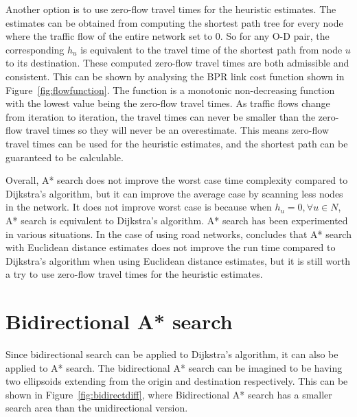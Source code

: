 Another option is to use zero-flow travel times for the heuristic estimates.
The estimates can be obtained from computing the shortest path tree for every node where the traffic flow of the entire network set to 0.
So for any O-D pair, the corresponding $h_u$ is equivalent to the travel time of the shortest path from node $u$ to its destination.
These computed zero-flow travel times are both admissible and consistent.
This can be shown by analysing the BPR link cost function shown in Figure~\ref{fig:flowfunction}.
The function is a monotonic non-decreasing function with the lowest value being the zero-flow travel times.
As traffic flows change from iteration to iteration,
the travel times can never be smaller than the zero-flow travel times so they will never be an overestimate.
This means zero-flow travel times can be used for the heuristic estimates, and the shortest path can be guaranteed to be calculable.

Overall, A* search does not improve the worst case time complexity compared to Dijkstra's algorithm,
but it can improve the average case by scanning less nodes in the network.
It does not improve worst case is because when $h_u = 0, \forall u \in N$, A* search is equivalent to Dijkstra's algorithm.
A* search has been experimented in various situations.
In the case of using road networks,
\citet{GoldbergLandmarks} concludes that A* search with Euclidean distance estimates does not improve the run time compared to Dijkstra's algorithm when using Euclidean distance estimates,
but it is still worth a try to use zero-flow travel times for the heuristic estimates.

\section{Bidirectional A* search}
Since bidirectional search can be applied to Dijkstra's algorithm,
it can also be applied to A* search.
The bidirectional A* search can be imagined to be having two ellipsoids extending from the origin and destination respectively.
This can be shown in Figure~\ref{fig:bidirectdiff},
where Bidirectional A* search has a smaller search area than the unidirectional version.

